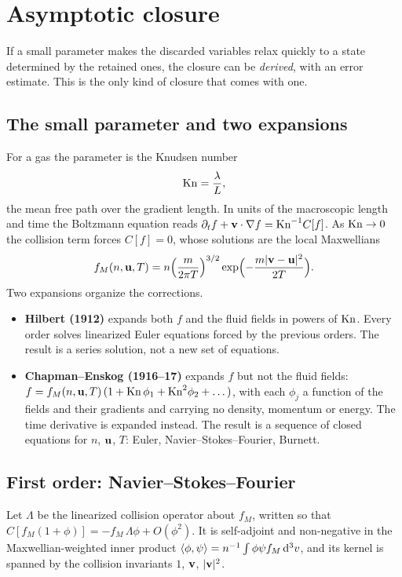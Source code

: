 \section{Asymptotic closure}
\label{sec:asym}

If a small parameter makes the discarded variables relax quickly to a state
determined by the retained ones, the closure can be \emph{derived}, with an
error estimate. This is the only kind of closure that comes with one.

\subsection{The small parameter and two expansions}

For a gas the parameter is the Knudsen number
\begin{equation}
  \mathrm{Kn} = \frac{\lambda}{L},
\end{equation}
the mean free path over the gradient length. In units of the macroscopic
length and time the Boltzmann equation reads
$\partial_tf+\mathbf{v}\cdot\nabla f=\mathrm{Kn}^{-1}C[f]$. As $\mathrm{Kn}\to0$ the collision
term forces $C[f]=0$, whose solutions are the local Maxwellians
\[
  f_M(n,\mathbf{u},T) = n\Bigl(\frac{m}{2\pi T}\Bigr)^{3/2}
  \exp\Bigl(-\frac{m|\mathbf{v}-\mathbf{u}|^2}{2T}\Bigr).
\]
Two expansions organize the corrections.
\begin{itemize}
  \item \textbf{Hilbert (1912)} expands both $f$ and the fluid fields in
    powers of $\mathrm{Kn}$. Every order solves linearized Euler equations forced by
    the previous orders. The result is a series solution, not a new set of
    equations.
  \item \textbf{Chapman--Enskog (1916--17)} expands $f$ but not the fluid
    fields:
    $f=f_M(n,\mathbf{u},T)\,(1+\mathrm{Kn}\,\phi_1+\mathrm{Kn}^2\phi_2+\dots)$, with each
    $\phi_j$ a function of the fields and their gradients and carrying no
    density, momentum or energy. The time derivative is expanded instead.
    The result is a sequence of closed equations for $n$, $\mathbf{u}$, $T$: Euler,
    Navier--Stokes--Fourier, Burnett.
\end{itemize}

\subsection{First order: Navier--Stokes--Fourier}
\label{sec:ce}

Let $\Lambda$ be the linearized collision operator about $f_M$, written so
that $C[f_M(1+\phi)] = -f_M\,\Lambda\phi+O(\phi^2)$. It is self-adjoint and
non-negative in the Maxwellian-weighted inner product
$\langle \phi,\psi \rangle=n^{-1}\int\phi\psi f_M\,\mathrm{d}^3v$, and its kernel is spanned
by the collision invariants $1$, $\mathbf{v}$, $|\mathbf{v}|^2$.

